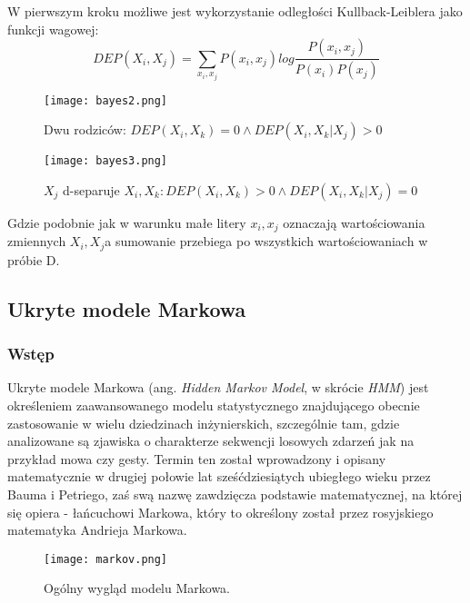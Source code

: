 W pierwszym kroku możliwe jest wykorzystanie odległości Kullback-Leiblera jako funkcji wagowej:
$$ DEP(X_{i}, X_{j}) = \sum_{x_{i}, x_{j}}^{ }  P(x_{i}, x_{j}) log \frac{P(x_{i}, x_{j})}{P(x_{i})P(x_{j})} $$

\begin{figure}[h!]
	\centering
	\texttt{[image: bayes2.png]}
	\label{bayes2}
	\caption{Dwu rodziców: \(DEP(X_{i},X_{k}) = 0 \wedge DEP(X_{i},X_{k}|X_{j}) > 0\)}
\end{figure}

\begin{figure}[h!]
	\centering
	\texttt{[image: bayes3.png]}
	\label{bayes3}
	\caption{\( X_{j}\) d-separuje \(X_{i},X_{k}:DEP(X_{i},X_{k})>0 \wedge DEP(X_{i},X_{k}|X_{j})=0\)}
\end{figure}

Gdzie podobnie jak w warunku małe litery \(x_{i}, x_{j}\) oznaczają wartościowania zmiennych \(X_{i}, X_{j} \)a sumowanie przebiega po wszystkich wartościowaniach w próbie D.





\newpage
\newpage

\subsection{Ukryte modele Markowa}

\subsubsection{Wstęp}

Ukryte modele Markowa (ang. \textit{Hidden Markov Model}, w skrócie \textit{HMM}) jest określeniem zaawansowanego modelu statystycznego znajdującego obecnie zastosowanie w wielu dziedzinach inżynierskich, szczególnie tam, gdzie analizowane są zjawiska o charakterze sekwencji losowych zdarzeń jak na przykład mowa czy gesty. Termin ten został wprowadzony i opisany matematycznie w drugiej połowie lat sześćdziesiątych ubiegłego wieku przez Bauma i Petriego, zaś swą nazwę zawdzięcza podstawie matematycznej, na której się opiera - łańcuchowi Markowa, który to określony został przez rosyjskiego matematyka Andrieja Markowa.

\begin{wrapfigure}{R}{0.5\textwidth}
  \centering
  \texttt{[image: markov.png]}
  \caption{\label{fig:markov}Ogólny wygląd modelu Markowa.}
\end{wrapfigure}

